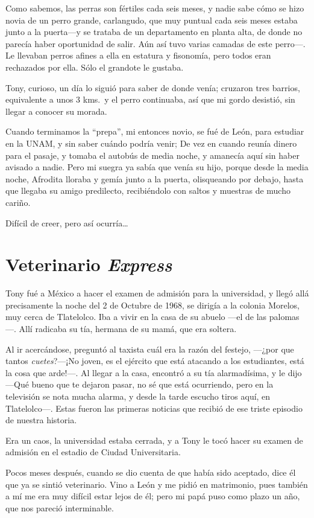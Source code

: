 \documentclass[letterpaper, 12pt]{book}
\begin{document}
Como sabemos, las perras son fértiles cada seis meses, y nadie sabe cómo se hizo novia de un perro grande, carlangudo, que muy puntual cada seis meses estaba junto a la puerta---y se trataba de un departamento en planta alta, de donde no parecía haber oportunidad de salir. Aún así tuvo varias camadas de este perro---. Le llevaban perros afines a ella en estatura y fisonomía, pero todos eran rechazados por ella. Sólo el grandote le gustaba.

Tony, curioso, un día lo siguió para saber de donde venía; cruzaron tres barrios, equivalente a unos 3 kms.\ y el perro continuaba, así que mi gordo desistió, sin llegar a conocer su morada.

Cuando terminamos la ``prepa'', mi entonces novio, se fué de León, para estudiar en la UNAM, y sin saber cuándo podría venir; De vez en cuando reunía dinero para el pasaje, y tomaba el autobús de media noche, y amanecía aquí sin haber avisado a nadie. Pero mi suegra ya sabía que venía su hijo, porque desde la media noche, Afrodita lloraba y gemía junto a la puerta, olisqueando por debajo, hasta que llegaba su amigo predilecto, recibiéndolo con saltos y muestras de mucho cariño.

Difícil de creer, pero así ocurría\ldots

\chapter{Veterinario \textit{Express}}
Tony fué a México a hacer el examen de admisión para la universidad, y llegó allá precisamente la noche del 2 de Octubre de 1968, se dirigía a la colonia Morelos, muy cerca de Tlatelolco. Iba a vivir en la casa de su abuelo ---el de las palomas---. Allí radicaba su tía, hermana de su mamá, que era soltera. 

Al ir acercándose, preguntó al taxista cuál era la razón del festejo, ---¿por que tantos \textit{cuetes}?---¡No joven, es el ejército que está atacando a los estudiantes, está la cosa que arde!---.
Al llegar a la casa, encontró a su tía alarmadísima, y le dijo ---Qué bueno que te dejaron pasar, no sé que está ocurriendo, pero en la televisión se nota mucha alarma, y desde la tarde escucho tiros aquí, en Tlatelolco---. Estas fueron las primeras noticias que recibió de ese triste episodio de nuestra historia. 

Era un caos, la universidad estaba cerrada, y a Tony le tocó hacer su examen de admisión en el estadio de Ciudad Universitaria. 

Pocos meses después, cuando se dio cuenta de que había sido aceptado, dice él que ya se sintió veterinario. Vino a León y me pidió en matrimonio, pues también a mí me era muy difícil estar lejos de él; pero mi papá puso como plazo un año, que nos pareció interminable.
\end{document}
